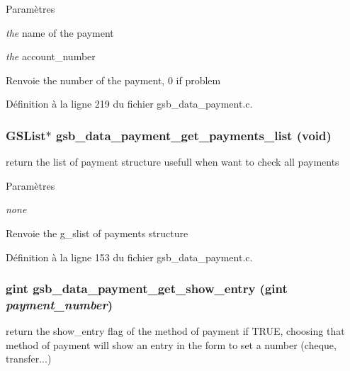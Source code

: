 \begin{DoxyParams}{Paramètres}
\item[{\em the}]name of the payment \item[{\em the}]account\_\-number\end{DoxyParams}
\begin{DoxyReturn}{Renvoie}
the number of the payment, 0 if problem 
\end{DoxyReturn}


Définition à la ligne 219 du fichier gsb\_\-data\_\-payment.c.

\subsubsection[{gsb\_\-data\_\-payment\_\-get\_\-payments\_\-list}]{\setlength{\rightskip}{0pt plus 5cm}GSList$\ast$ gsb\_\-data\_\-payment\_\-get\_\-payments\_\-list (void)}\label{gsb__data__payment_8h_acec454aa5a57af2dd716d6b38e97baec}
return the list of payment structure usefull when want to check all payments


\begin{DoxyParams}{Paramètres}
\item[{\em none}]\end{DoxyParams}
\begin{DoxyReturn}{Renvoie}
the g\_\-slist of payments structure 
\end{DoxyReturn}


Définition à la ligne 153 du fichier gsb\_\-data\_\-payment.c.

\subsubsection[{gsb\_\-data\_\-payment\_\-get\_\-show\_\-entry}]{\setlength{\rightskip}{0pt plus 5cm}gint gsb\_\-data\_\-payment\_\-get\_\-show\_\-entry (gint {\em payment\_\-number})}\label{gsb__data__payment_8h_a8255baec69955b14988acbff6f5bc3d9}
return the show\_\-entry flag of the method of payment if TRUE, choosing that method of payment will show an entry in the form to set a number (cheque, transfer...)


